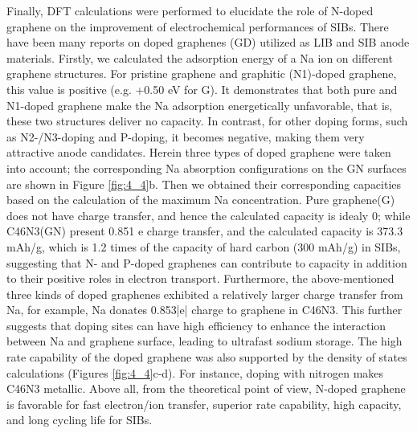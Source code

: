 Finally, DFT calculations were performed to elucidate the role of N-doped graphene on the improvement of electrochemical performances of SIBs. There have been many reports on doped graphenes (GD) utilized as LIB and SIB anode materials.\cite{Yang2011c,Wen2014b,Wang2013h,Wang2012e,Wang2014f} Firstly, we calculated the adsorption energy of a Na ion on different graphene structures. For pristine graphene and graphitic (N1)-doped graphene, this value is positive (e.g. +0.50 eV for G). It demonstrates that both pure and N1-doped graphene make the Na adsorption energetically unfavorable, that is, these two structures deliver no capacity. In contrast, for other doping forms, such as N2-/N3-doping and P-doping, it becomes negative, making them very attractive anode candidates. Herein three types of doped graphene were taken into account; the corresponding Na absorption configurations on the GN surfaces are shown in Figure \ref{fig:4_4}b. Then we obtained their corresponding capacities based on the calculation of the maximum Na concentration. Pure graphene(G) does not have charge transfer, and hence the calculated capacity is idealy 0; while C46N3(GN) present 0.851 e charge transfer, and the calculated capacity is 373.3 mAh/g, which is 1.2 times of the capacity of hard carbon (300 mAh/g) in SIBs, suggesting that N- and P-doped graphenes can contribute to capacity in addition to their positive roles in electron transport. Furthermore, the above-mentioned three kinds of doped graphenes exhibited a relatively larger charge transfer from Na, for example, Na donates 0.853|e| charge to graphene in C46N3. This further suggests that doping sites can have high efficiency to enhance the interaction between Na and graphene surface, leading to ultrafast sodium storage. The high rate capability of the doped graphene was also supported by the density of states calculations (Figures \ref{fig:4_4}c-d). For instance, doping with nitrogen makes C46N3 metallic. Above all, from the theoretical point of view, N-doped graphene is favorable for fast electron/ion transfer, superior rate capability, high capacity, and long cycling life for SIBs.

